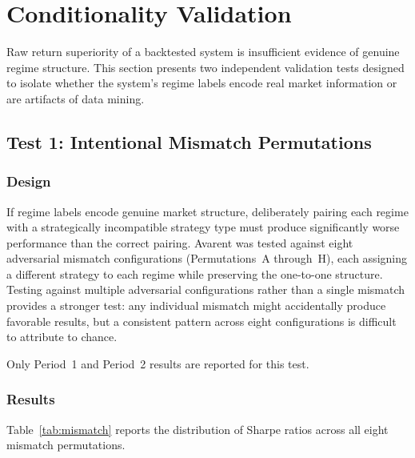\documentclass[12pt]{article}
\begin{document}
\section{Conditionality Validation}
\label{sec:conditionality}

Raw return superiority of a backtested system is insufficient evidence of genuine regime structure.
This section presents two independent validation tests designed to isolate whether the system's regime labels encode real market information or are artifacts of data mining.

\subsection{Test 1: Intentional Mismatch Permutations}

\subsubsection{Design}

If regime labels encode genuine market structure, deliberately pairing each regime with a strategically incompatible strategy type must produce significantly worse performance than the correct pairing.
Avarent was tested against eight adversarial mismatch configurations (Permutations~A through~H), each assigning a different strategy to each regime while preserving the one-to-one structure.
Testing against multiple adversarial configurations rather than a single mismatch provides a stronger test: any individual mismatch might accidentally produce favorable results, but a consistent pattern across eight configurations is difficult to attribute to chance.

Only Period~1 and Period~2 results are reported for this test.

\subsubsection{Results}

Table~\ref{tab:mismatch} reports the distribution of Sharpe ratios across all eight mismatch permutations.
\end{document}
